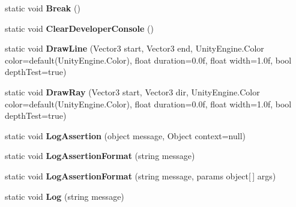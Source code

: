 \begin{DoxyCompactItemize}
\item 
\mbox{\label{class_lerp2_a_p_i_1_1_debug_handler_1_1_debug_a03bf5d49128b85f5a430c1f8e845dec0}} 
static void {\bfseries Break} ()
\item 
\mbox{\label{class_lerp2_a_p_i_1_1_debug_handler_1_1_debug_ae1b6b2ba74495240aeaa5c5ac4e81e7f}} 
static void {\bfseries Clear\+Developer\+Console} ()
\item 
\mbox{\label{class_lerp2_a_p_i_1_1_debug_handler_1_1_debug_a805210e32bd72b6b0d891ea43ecd3de2}} 
static void {\bfseries Draw\+Line} (Vector3 start, Vector3 end, Unity\+Engine.\+Color color=default(Unity\+Engine.\+Color), float duration=0.\+0f, float width=1.\+0f, bool depth\+Test=true)
\item 
\mbox{\label{class_lerp2_a_p_i_1_1_debug_handler_1_1_debug_a7694dbc564a0c8d7370750d78f081f82}} 
static void {\bfseries Draw\+Ray} (Vector3 start, Vector3 dir, Unity\+Engine.\+Color color=default(Unity\+Engine.\+Color), float duration=0.\+0f, float width=1.\+0f, bool depth\+Test=true)
\item 
\mbox{\label{class_lerp2_a_p_i_1_1_debug_handler_1_1_debug_a91b6fb8fbc1aeefadcc5a6a3162c95b5}} 
static void {\bfseries Log\+Assertion} (object message, Object context=null)
\item 
\mbox{\label{class_lerp2_a_p_i_1_1_debug_handler_1_1_debug_a24b8deacd6bebebdd182645753579511}} 
static void {\bfseries Log\+Assertion\+Format} (string message)
\item 
\mbox{\label{class_lerp2_a_p_i_1_1_debug_handler_1_1_debug_a38b841f81aa6aa779f2f32587d8d8965}} 
static void {\bfseries Log\+Assertion\+Format} (string message, params object\mbox{[}$\,$\mbox{]} args)
\item 
\mbox{\label{class_lerp2_a_p_i_1_1_debug_handler_1_1_debug_ad94b2bba1f5e6e28597f342b56c53f18}} 
static void {\bfseries Log} (string message)

\end{DoxyCompactItemize}

